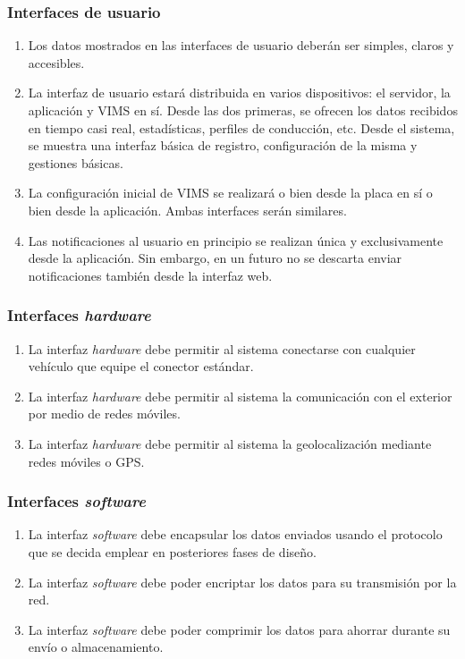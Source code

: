 \subsubsection{Interfaces de usuario}
\begin{enumerate}[resume, label=\textbf{\texttt{RNF-\arabic*}}]
  \item\label{nf:pretty} Los datos mostrados en las interfaces de usuario deberán
  ser simples, claros y accesibles.
  \item\label{nf:devices} La interfaz de usuario estará distribuida en varios
  dispositivos: el servidor, la aplicación y \ac{VIMS} en sí. Desde las dos primeras,
  se ofrecen los datos recibidos en tiempo casi real, estadísticas, perfiles de
  conducción, etc. Desde el sistema, se muestra una interfaz básica de registro,
  configuración de la misma y gestiones básicas.
  \item\label{nf:initial-config} La configuración inicial de \ac{VIMS} se realizará
  o bien desde la placa en sí o bien desde la aplicación. Ambas interfaces serán
  similares.
  \item\label{nf:notifications} Las notificaciones al usuario en principio se
  realizan única y exclusivamente desde la aplicación. Sin embargo, en un futuro
  no se descarta enviar notificaciones también desde la interfaz web.
\end{enumerate}

\subsubsection{Interfaces \textit{hardware}}
\begin{enumerate}[resume, label=\textbf{\texttt{RNF-\arabic*}}]
  \item\label{nf:hardware-obd} La interfaz \textit{hardware} debe permitir al sistema
  conectarse con cualquier vehículo que equipe el conector estándar.
  \item\label{nf:hardware-net} La interfaz \textit{hardware} debe permitir al sistema
  la comunicación con el exterior por medio de redes móviles.
  \item\label{nf:hardware-gps} La interfaz \textit{hardware} debe permitir al sistema
  la geolocalización mediante redes móviles o \ac{GPS}.
\end{enumerate}

\subsubsection{Interfaces \textit{software}}
\begin{enumerate}[resume, label=\textbf{\texttt{RNF-\arabic*}}]
  \item\label{nf:protocol} La interfaz \textit{software} debe encapsular los
  datos enviados usando el protocolo que se decida emplear en posteriores fases
  de diseño.
  \item\label{nf:encryption} La interfaz \textit{software} debe poder encriptar
  los datos para su transmisión por la red.
  \item\label{nf:compression} La interfaz \textit{software} debe poder comprimir
  los datos para ahorrar durante su envío o almacenamiento.
\end{enumerate}

